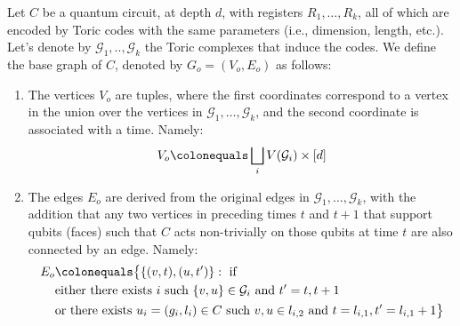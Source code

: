   \begin{definition}
    Let $C$ be a quantum circuit, at depth $d$, with registers $R_{1}, \ldots, R_{k}$, all of which are encoded by Toric codes with the same parameters (i.e., dimension, length, etc.). Let's denote by $\mathcal{G}_{1}, .., \mathcal{G}_{k}$ the Toric complexes that induce the codes. We define the base graph of $C$, denoted by $G_{o} = (V_{o},E_{o})$ as follows: 
    \begin{enumerate}
      \item The vertices $V_{o}$ are tuples, where the first coordinates correspond to a vertex in the union over the vertices in $\mathcal{G}_{1}, \ldots, \mathcal{G}_{k}$, and the second coordinate is associated with a time. Namely:
        \begin{equation*}
          \begin{split}
            V_{o} \colonequals \bigsqcup_{i} V(\mathcal{G}_{i}) \times [d]
          \end{split}
        \end{equation*}
      \item The edges $E_{o}$ are derived from the original edges in $\mathcal{G}_{1}, \ldots, \mathcal{G}_{k}$, with the addition that any two vertices in preceding times $t$ and $t+1$ that support qubits (faces) such that $C$ acts non-trivially on those qubits at time $t$ are also connected by an edge. Namely:
        \begin{equation*}
          \begin{split}
            E_{o} & \colonequals \big\{ \{(v,t), (u,t^{\prime}) \} :  \text{ if }     \\ 
              & \text{either there exists } i \text{ such }  \{v,u\} \in \mathcal{G}_{i} \text{ and } t^{\prime} = t,t+1 \\
             & \text{or there exists } u_i = (g_{i},l_{i}) \in C \text{ such }  v,u \in l_{i,2} \text{ and } t = l_{i,1}, t^{\prime} = l_{i,1}+1  \big\} 
          \end{split}
        \end{equation*}
    \end{enumerate} 

  \end{definition}




